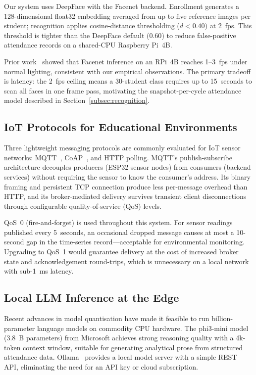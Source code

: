 Our system uses DeepFace with the Facenet backend.  Enrollment
generates a 128-dimensional float32 embedding averaged from up to five
reference images per student; recognition applies cosine-distance
thresholding ($d < 0.40$) at 2~fps.  This threshold is tighter than
the DeepFace default ($0.60$) to reduce false-positive attendance
records on a shared-CPU Raspberry Pi~4B.

Prior work~\cite{rpi_face_2022} showed that Facenet inference on an
RPi~4B reaches 1--3~fps under normal lighting, consistent with our
empirical observations.  The primary tradeoff is latency: the 2~fps
ceiling means a 30-student class requires up to 15~seconds to scan
all faces in one frame pass, motivating the snapshot-per-cycle
attendance model described in Section~\ref{subsec:recognition}.

\subsection{IoT Protocols for Educational Environments}
\label{subsec:lit_mqtt}

Three lightweight messaging protocols are commonly evaluated for IoT
sensor networks: MQTT~\cite{mqtt_spec_5}, CoAP~\cite{rfc7252_coap},
and HTTP polling.  MQTT's publish-subscribe architecture decouples
producers (ESP32 sensor nodes) from consumers (backend services)
without requiring the sensor to know the consumer's address.  Its
binary framing and persistent TCP connection produce less per-message
overhead than HTTP, and its broker-mediated delivery survives transient
client disconnections through configurable quality-of-service (QoS)
levels.

QoS~0 (fire-and-forget) is used throughout this system.  For sensor
readings published every 5~seconds, an occasional dropped message
causes at most a 10-second gap in the time-series record---acceptable
for environmental monitoring.  Upgrading to QoS~1 would guarantee
delivery at the cost of increased broker state and acknowledgement
round-trips, which is unnecessary on a local network with sub-1~ms
latency.

\subsection{Local LLM Inference at the Edge}
\label{subsec:lit_llm}

Recent advances in model quantisation have made it feasible to run
billion-parameter language models on commodity CPU hardware.  The
phi3-mini model~\cite{phi3_mini_2024} (3.8~B parameters) from Microsoft
achieves strong reasoning quality with a 4k-token context window,
suitable for generating analytical prose from structured attendance data.
Ollama~\cite{ollama_2024} provides a local model server with a simple
REST API, eliminating the need for an API key or cloud subscription.


